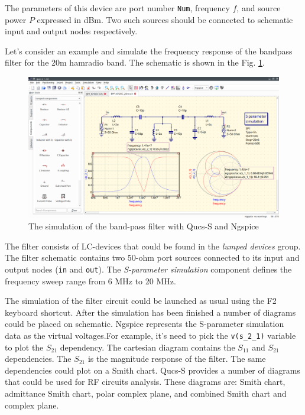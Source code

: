 \documentclass[a4paper,12pt]{article}
\begin{document}
The parameters of this device are port number \verb|Num|, frequency $f$, and source power $P$ expressed in dBm. Two such sources should be connected to schematic input and output nodes respectively. 

Let's consider an example and simulate the frequency response of the bandpass filter for the 20m hamradio band. The schematic is shown in the Fig. \ref{fig:filt20m}. 

    \begin{figure}[!ht]
    \begin{center}
        \includegraphics[width=\textwidth]{img/filt20sim.png}
    \end{center}
    \caption{The simulation of the band-pass filter with Qucs-S and Ngspice} \label{fig:filt20m}
    \end{figure}
    
The filter consists of LC-devices that could be found in the \emph{lumped devices} group. The filter schematic contains two 50-ohm port sources connected to its input and output nodes (\verb|in| and \verb|out|). The \emph{S-parameter simulation} component defines the frequency sweep range from 6 MHz to 20 MHz.
    
The simulation of the filter circuit could be launched as usual using the F2 keyboard shortcut. After the simulation has been finished a number of diagrams could be placed on schematic. Ngspice represents the S-parameter simulation data as the virtual voltages.For example, it's need to pick the \verb|v(s_2_1)| variable to plot the $S_{21}$ dependency. The cartesian diagram contains the $S_{11}$ and $S_{21}$ dependencies. The $S_{21}$ is the magnitude response of the filter. The same dependencies could plot on a Smith chart. Qucs-S provides a number of diagrams that could be used for RF circuits analysis. These diagrams are: Smith chart, admittance Smith chart, polar complex plane, and combined Smith chart and complex plane. 
\end{document}
